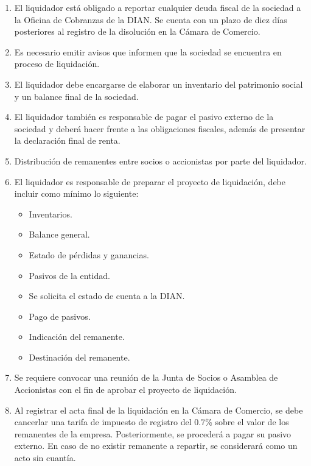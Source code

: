 {\begin{enumerate}
    \item El liquidador está obligado a reportar cualquier deuda fiscal de la sociedad a la Oficina de Cobranzas de la DIAN. Se cuenta con un plazo de diez días posteriores al registro de la disolución en la Cámara de Comercio. 
    
    \item Es necesario emitir avisos que informen que la sociedad se encuentra en proceso de liquidación. 
    
    \item El liquidador debe encargarse de elaborar un inventario del patrimonio social y un balance final de la sociedad.
    
    \item El liquidador también es responsable de pagar el pasivo externo de la sociedad y deberá hacer frente a las obligaciones fiscales, además de presentar la declaración final de renta. 
    
    \item Distribución de remanentes entre socios o accionistas por parte del liquidador. 
    
    \item El liquidador es responsable de preparar el proyecto de liquidación, debe incluir como mínimo lo siguiente: 
    
    \begin{itemize}
        \item Inventarios.
        \item Balance general.
        \item Estado de pérdidas y ganancias.
        \item Pasivos de la entidad.
        \item Se solicita el estado de cuenta a la DIAN.
        \item Pago de pasivos.
        \item Indicación del remanente.
        \item Destinación del remanente.
    \end{itemize}
    
    \item Se requiere convocar una reunión de la Junta de Socios o Asamblea de Accionistas con el fin de aprobar el proyecto de liquidación.
    
    \item Al registrar el acta final de la liquidación en la Cámara de Comercio, se debe cancerlar una tarifa de impuesto de registro del 0.7\% sobre el valor de los remanentes de la empresa. Posteriormente, se procederá a pagar su pasivo externo. En caso de no existir remanente a repartir, se considerará como un acto sin cuantía. 
    

\end{enumerate}}
